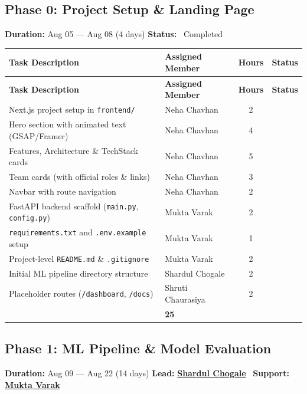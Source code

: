 \documentclass[11pt, a4paper]{article}
\newcommand{\cmark}{\textcolor{accent}{\ding{51}}}
\newcommand{\goref}[2]{\hyperref[#1]{\textcolor{primary}{\textbf{#2}}}}
\begin{document}
\subsection{Phase 0: Project Setup \& Landing Page}
\label{sec:phase0}
\textbf{Duration:} Aug 05 — Aug 08 (4 days) \hfill \textbf{Status:} \cmark~Completed

\noindent
\small
\begin{longtable}{|p{}|p{}|c|c|}
\hline
\rowcolor{primary!10}
\textbf{Task Description} & \textbf{Assigned Member} & \textbf{Hours} & \textbf{Status} \\
\hline
\endfirsthead
\hline
\rowcolor{primary!10}
\textbf{Task Description} & \textbf{Assigned Member} & \textbf{Hours} & \textbf{Status} \\
\hline
\endhead
Next.js project setup in \texttt{frontend/} & Neha Chavhan & 2 & \cmark \\
Hero section with animated text (GSAP/Framer) & Neha Chavhan & 4 & \cmark \\
Features, Architecture \& TechStack cards & Neha Chavhan & 5 & \cmark \\
Team cards (with official roles \& links) & Neha Chavhan & 3 & \cmark \\
Navbar with route navigation & Neha Chavhan & 2 & \cmark \\
FastAPI backend scaffold (\texttt{main.py}, \texttt{config.py}) & Mukta Varak & 2 & \cmark \\
\texttt{requirements.txt} and \texttt{.env.example} setup & Mukta Varak & 1 & \cmark \\
Project-level \texttt{README.md} \& \texttt{.gitignore} & Mukta Varak & 2 & \cmark \\
Initial ML pipeline directory structure & Shardul Chogale & 2 & \cmark \\
Placeholder routes (\texttt{/dashboard}, \texttt{/docs}) & Shruti Chaurasiya & 2 & \cmark \\
\hline
\rowcolor{lightgray}
\multicolumn{2}{|r|}{\textbf{Phase 0 Total}} & \textbf{25} & \cmark \\
\hline
\end{longtable}
\normalsize

\subsection{Phase 1: ML Pipeline \& Model Evaluation}
\label{sec:phase1}
\textbf{Duration:} Aug 09 — Aug 22 (14 days) \hfill \textbf{Lead:} \goref{sec:team}{Shardul Chogale} \textbar~\textbf{Support:} \goref{sec:team}{Mukta Varak}
\end{document}
